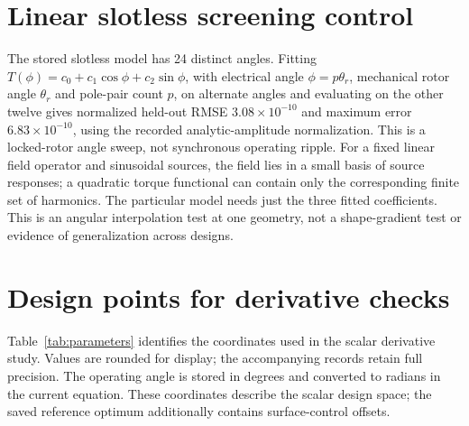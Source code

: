 \documentclass{anvil-paper}
\begin{document}
\appendix
\section{Linear slotless screening control}\label{sec:slotless}
The stored slotless model has 24 distinct angles. Fitting
$T(\phi)=c_0+c_1\cos\phi+c_2\sin\phi$, with electrical angle $\phi=p\theta_r$, mechanical rotor angle $\theta_r$
and pole-pair count $p$, on alternate angles and
evaluating on the other twelve gives normalized held-out RMSE
$3.08\times10^{-10}$ and maximum error $6.83\times10^{-10}$, using the
recorded analytic-amplitude normalization. This is a locked-rotor angle sweep,
not synchronous operating ripple. For a fixed linear field operator and
sinusoidal sources, the field lies in a small basis of source responses;
a quadratic torque functional can contain only the corresponding finite
set of harmonics. The particular model needs just the three fitted
coefficients. This is an angular interpolation test at one geometry,
not a shape-gradient test or evidence of generalization across designs.

\section{Design points for derivative checks}\label{sec:parameters}
Table~\ref{tab:parameters} identifies the coordinates used in the scalar
derivative study. Values are rounded for display; the accompanying records
retain full precision. The operating angle is stored in degrees and
converted to radians in the current equation. These coordinates describe
the scalar design space; the saved reference optimum additionally contains
surface-control offsets.
\begin{table}[H]\centering\small
\caption{Initial and interior perturbed design points for the derivative
checks. Lengths refer to the unscaled geometry.}\label{tab:parameters}

\end{table}



\end{document}

